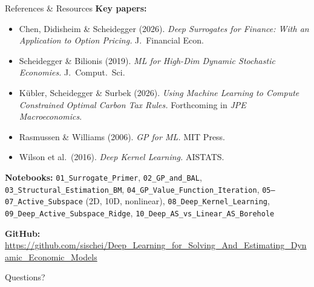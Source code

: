 \documentclass[aspectratio=169,11pt]{beamer}
\newcommand{\emphc}[1]{\textcolor{harvardcrimson}{#1}}
\begin{document}
\begin{frame}[shrink=5]{References \& Resources}
\footnotesize
\textbf{Key papers:}
\begin{itemize}\itemsep0pt \parskip0pt
  \item Chen, Didisheim \& Scheidegger (2026). \emph{Deep Surrogates for Finance: With an Application to Option Pricing.} J.\ Financial Econ.
  \item Scheidegger \& Bilionis (2019). \emph{ML for High-Dim Dynamic Stochastic Economies.} J.\ Comput.\ Sci.
  \item K\"ubler, Scheidegger \& Surbek (2026). \emph{Using Machine Learning to Compute Constrained Optimal Carbon Tax Rules.} Forthcoming in \emph{JPE Macroeconomics}.
  \item Rasmussen \& Williams (2006). \emph{GP for ML.} MIT Press.
  \item Wilson et al.\ (2016). \emph{Deep Kernel Learning.} AISTATS.
\end{itemize}

\vspace{0.1cm}
{\tiny \textbf{Notebooks:} \texttt{01\_Surrogate\_Primer}, \texttt{02\_GP\_and\_BAL}, \texttt{03\_Structural\_Estimation\_BM}, \texttt{04\_GP\_Value\_Function\_Iteration}, \texttt{05--07\_Active\_Subspace} (2D, 10D, nonlinear), \texttt{08\_Deep\_Kernel\_Learning}, \texttt{09\_Deep\_Active\_Subspace\_Ridge}, \texttt{10\_Deep\_AS\_vs\_Linear\_AS\_Borehole}}

\vspace{0.15cm}
\textbf{GitHub:} \url{https://github.com/sischei/Deep_Learning_for_Solving_And_Estimating_Dynamic_Economic_Models}

\vspace{0.2cm}
\begin{center}
{\LARGE \emphc{Questions?}}
\end{center}
\end{frame}
\end{document}
